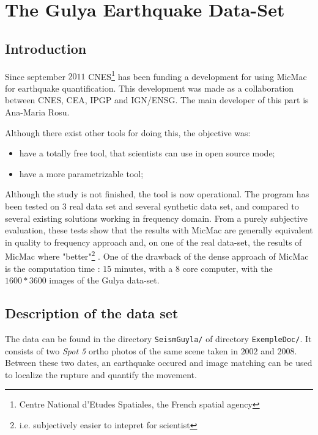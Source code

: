 \section{The Gulya Earthquake Data-Set}

\label{Gulya}

\subsection{Introduction}

Since september $2011$ CNES\footnote{Centre National d'Etudes Spatiales, the French spatial agency}
has been funding a development for using MicMac for  earthquake quantification. This development
was made as a collaboration between CNES, CEA, IPGP and IGN/ENSG. The main developer of this part
is Ana-Maria Rosu.

Although there exist other tools for doing this, the objective was:

\begin{itemize}
   \item have a totally free tool, that scientists can use in open source mode;
   \item have a more parametrizable tool;
\end{itemize}

Although the study is not finished, the tool  is now operational. The program has been
tested on $3$ real data set and several synthetic data set, and compared to several existing solutions 
working in frequency domain. From a purely subjective evaluation, these tests show that the
results with MicMac are generally equivalent in quality to frequency approach and, on one of the
real data-set, the results of MicMac where "better"\footnote{i.e. subjectively easier to intepret
for scientist} . One of the drawback of the dense approach of
MicMac is the computation time : $15$ minutes, with a $8$ core computer, with the $1600*3600$
images of the Gulya data-set.



\subsection{Description of the data set}

The data can be found in the directory {\tt {SeismGuyla/}} 
 of directory {\tt ExempleDoc/}. %
It consists of  two \emph{Spot 5} ortho photos of the same scene taken in $2002$ and
$2008$. Between these two dates, an earthquake occured and image matching can be used to
localize the rupture and quantify the movement.


